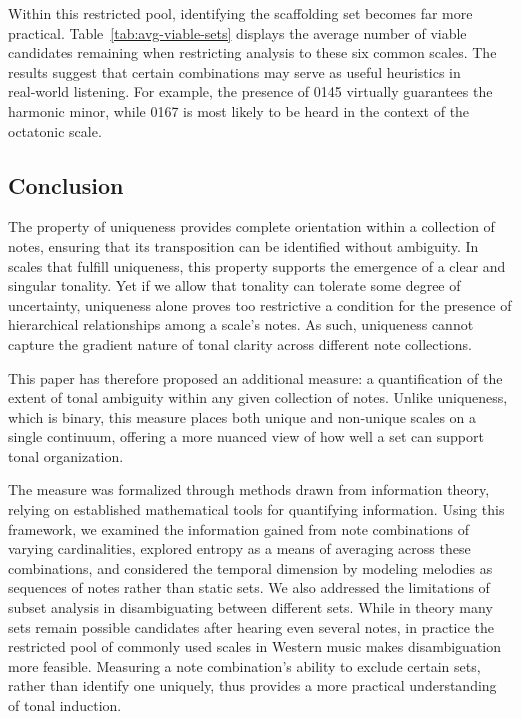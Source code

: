 \documentclass[10pt,twocolumn]{article}
\numberwithin{equation}{section} %
\begin{document}
    Within this restricted pool, identifying the scaffolding set becomes far more practical.
    Table~\ref{tab:avg-viable-sets} displays the average number of viable candidates remaining when restricting analysis to these six common scales.
    The results suggest that certain combinations may serve as useful heuristics in real‑world listening.
    For example, the presence of 0145 virtually guarantees the harmonic minor, while 0167 is most likely to be heard in the context of the octatonic scale.

    

    \subsection{Conclusion}

    The property of uniqueness provides complete orientation within a collection of notes, ensuring that its transposition can be identified without ambiguity.
    In scales that fulfill uniqueness, this property supports the emergence of a clear and singular tonality.
    Yet if we allow that tonality can tolerate some degree of uncertainty, uniqueness alone proves too restrictive a condition for the presence of hierarchical relationships among a scale's notes.
    As such, uniqueness cannot capture the gradient nature of tonal clarity across different note collections.

    This paper has therefore proposed an additional measure: a quantification of the extent of tonal ambiguity within any given collection of notes.
    Unlike uniqueness, which is binary, this measure places both unique and non‑unique scales on a single continuum, offering a more nuanced view of how well a set can support tonal organization.

    The measure was formalized through methods drawn from information theory, relying on established mathematical tools for quantifying information.
    Using this framework, we examined the information gained from note combinations of varying cardinalities, explored entropy as a means of averaging across these combinations, and considered the temporal dimension by modeling melodies as sequences of notes rather than static sets.
    We also addressed the limitations of subset analysis in disambiguating between different sets.
    While in theory many sets remain possible candidates after hearing even several notes, in practice the restricted pool of commonly used scales in Western music makes disambiguation more feasible.
    Measuring a note combination's ability to exclude certain sets, rather than identify one uniquely, thus provides a more practical understanding of tonal induction.
\end{document}
